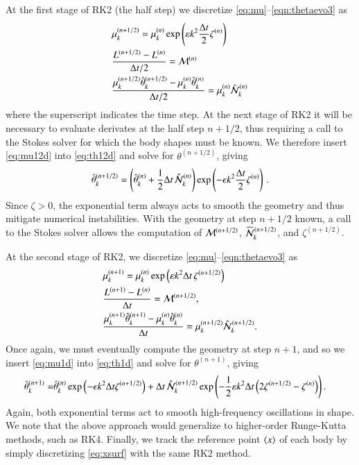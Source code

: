 \documentclass[preprint, 10pt]{elsarticle}
\begin{document}
At the first stage of RK2 (the half step) we discretize \eqref{eq:mu}--\eqref{eqn:thetaevo3} as
\begin{align}
\label{eq:mu12d}
& \mu_k^{(n+1/2)} = \mu_k^{(n)} \exp \left( \varepsilon k^2 \frac{\Delta t}{2} \zeta^{(n)} \right) \\
\label{eq:L12d}
& \frac{L^{(n+1/2)} - L^{(n)}}{\Delta t/2} = \mathcal{M}^{(n)} \\
\label{eq:th12d}
& \frac{ \mu_k^{(n+1/2)} \hat{\theta}_k^{(n+1/2)} - \mu_k^{(n)} \hat{\theta}_k^{(n)}}{\Delta t/2} 
= \mu_k^{(n)} \hat{\mathcal{N}}_k^{(n)}
\end{align}
where the superscript indicates the time step. At the next stage of RK2 it will be necessary to evaluate derivates at the half step $n+1/2$, thus requiring a call to the Stokes solver for which the body shapes must be known. We therefore insert \eqref{eq:mu12d} into \eqref{eq:th12d} and solve for $\theta^{(n+1/2)}$, giving
\begin{align}
\label{eq:th12}
\hat{\theta}_k^{(n+1/2)} = \left( \hat{\theta}_k^{(n)} + \frac{1}{2} \Delta t \, \hat{\mathcal{N}}_k^{(n)} \right)
\exp \left( -\epsilon k^2 \frac{\Delta t}{2} \zeta^{(n)}\right) \, .
\end{align}
Since $\zeta >0$, the exponential term always acts to smooth the geometry and thus mitigate numerical instabilities. With the geometry at step $n+1/2$ known, a call to the Stokes solver allows the computation of $\mathcal{M}^{(n+1/2)}$, $\widehat{\NLterm}_k^{(n+1/2)}$, and $\zeta^{(n+1/2)}$.

At the second stage of RK2, we discretize \eqref{eq:mu}--\eqref{eqn:thetaevo3} as 
\begin{align}
\label{eq:mu1d}
& \mu_k^{(n+1)} = \mu_k^{(n)} \exp \left( \varepsilon k^2 {\Delta t} \, \zeta^{(n+1/2)} \right) \\
\label{eq:L1d}
& \frac{L^{(n+1)} - L^{(n)}}{\Delta t} = \mathcal{M}^{(n+1/2)}, \\
\label{eq:th1d}
& \frac{ \mu_k^{(n+1)} \hat{\theta}_k^{(n+1)} - \mu_k^{(n)} \hat{\theta}_k^{(n)}}{\Delta t} =
\mu_k^{(n+1/2)} \hat{\mathcal{N}}_k^{(n+1/2)}.
\end{align}
Once again, we must eventually compute the geometry at step $n+1$, and so we insert \eqref{eq:mu1d} into \eqref{eq:th1d} and solve for $\theta^{(n+1)}$, giving
\begin{align}
\hat{\theta}_k^{(n+1)} = & \hat{\theta}_k^{(n)} \exp \left( - \epsilon k^2 \Delta t \zeta^{(n+1/2)} \right) + \Delta t \, \hat{\mathcal{N}}_k^{(n+1/2)} \exp \left( - \frac{1}{2} \varepsilon k^2 \Delta t \left( 2 \zeta^{(n+1/2)} - \zeta^{(n)} \right) \right).
\end{align}
Again, both exponential terms act to smooth high-frequency oscillations in shape. We note that the above approach would generalize to higher-order Runge-Kutta methods, such as RK4. Finally, we track the reference point $\left< x \right>$ of each body by simply discretizing \eqref{eq:xsurf} with the same RK2 method.
\end{document}
